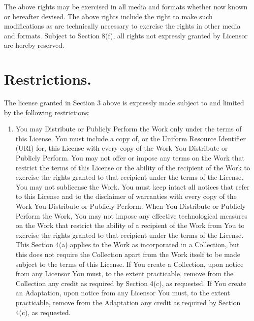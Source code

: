 The above rights may be exercised in all media and
formats whether now known or hereafter devised. The above
rights include the right to make such modifications as are
technically necessary to exercise the rights in other media
and formats. Subject to Section 8(f), all rights not
expressly granted by Licensor are hereby reserved.

\section{Restrictions.} The license granted in
Section 3 above is expressly made subject to and limited by
the following restrictions:

\begin{enumerate}
\item You may Distribute or Publicly Perform the Work only
  under the terms of this License. You must include a copy
  of, or the Uniform Resource Identifier (URI) for, this
  License with every copy of the Work You Distribute or
  Publicly Perform. You may not offer or impose any terms
  on the Work that restrict the terms of this License or
  the ability of the recipient of the Work to exercise the
  rights granted to that recipient under the terms of the
  License. You may not sublicense the Work. You must keep
  intact all notices that refer to this License and to the
  disclaimer of warranties with every copy of the Work You
  Distribute or Publicly Perform. When You Distribute or
  Publicly Perform the Work, You may not impose any
  effective technological measures on the Work that
  restrict the ability of a recipient of the Work from You
  to exercise the rights granted to that recipient under
  the terms of the License. This Section 4(a) applies to
  the Work as incorporated in a Collection, but this does
  not require the Collection apart from the Work itself to
  be made subject to the terms of this License. If You
  create a Collection, upon notice from any Licensor You
  must, to the extent practicable, remove from the
  Collection any credit as required by Section 4(c), as
  requested. If You create an Adaptation, upon notice from
  any Licensor You must, to the extent practicable, remove
  from the Adaptation any credit as required by Section
  4(c), as requested.


\end{enumerate}
